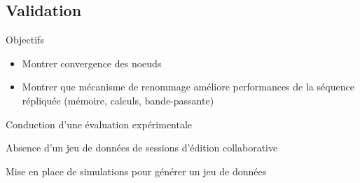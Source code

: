 \subsection{Validation}

\begin{frame}{Objectifs}
  \begin{itemize}
    \item Montrer convergence des noeuds
    \item Montrer que mécanisme de renommage améliore performances de la séquence répliquée (mémoire, calculs, bande-passante)
  \end{itemize}
  \alert{Conduction d'une évaluation expérimentale}
\end{frame}

\begin{frame}[standout]
  \alert{Absence d'un jeu de données de sessions d'édition collaborative}

  \medskip
  Mise en place de simulations pour générer un jeu de données
\end{frame}

